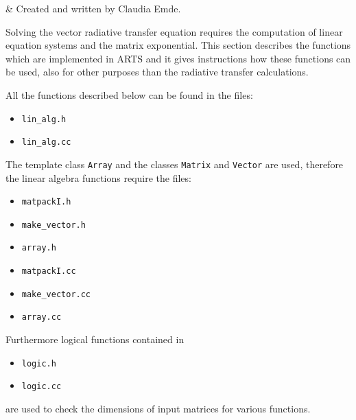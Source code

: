 \label{sec:lin_alg}

 & Created and written by Claudia Emde.\\
\stophistory

%
%

Solving the vector radiative transfer equation requires the
computation of linear equation systems and the matrix
exponential. This section describes the functions which are implemented
in ARTS and it gives instructions how these functions can be used, also
for other purposes than the radiative transfer calculations.

\label{sec:lin_alg:files}

All the functions described below can be found in the files:
\begin{itemize}
\item \verb|lin_alg.h|
\item \verb|lin_alg.cc|
\end{itemize}
The template class \verb|Array| and the classes \verb|Matrix| and
\verb|Vector| are used, therefore the linear algebra functions require
the files:
\begin{itemize}
\item \verb|matpackI.h|
\item \verb|make_vector.h|
\item \verb|array.h|
\item \verb|matpackI.cc|
\item \verb|make_vector.cc|
\item \verb|array.cc|
\end{itemize}
Furthermore logical functions contained in
\begin{itemize}
\item \verb|logic.h|
\item \verb|logic.cc|
\end{itemize}
are used to check the dimensions of input matrices for various functions.


\label{sec:lin_alg:lineqsys}



